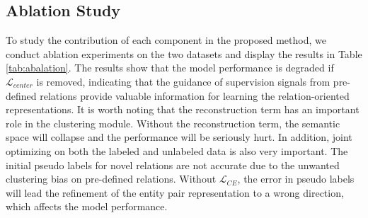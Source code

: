 \documentclass[11pt]{article}
\begin{document}
    \subsection{Ablation Study}
        \label{sec:ablation}
        \begin{table}
            \centering
            \caption{Abalation study of our method. This table only lists the results of metric $B^3$. For results of other metrics, please refer to the Table \ref{tab:det_aba} in Appendix \ref{app:other}.}
            \label{tab:abalation}
        \end{table}              
        To study the contribution of each component in the proposed method, we conduct ablation experiments on the two datasets and display the results in Table \ref{tab:abalation}. The results show that the model performance is degraded if $\mathcal{L}_{center}$ is removed, indicating that the guidance of supervision signals from pre-defined relations provide valuable information for learning the relation-oriented representations. It is worth noting that the reconstruction term has an important role in the clustering module. Without the reconstruction term, the semantic space will collapse and the performance will be seriously hurt. In addition, joint optimizing on both the labeled and unlabeled data is also very important. The initial pseudo labels for novel relations are not accurate due to the unwanted clustering bias on pre-defined relations. Without $\mathcal{L}_{CE}$, the error in pseudo labels will lead the refinement of the entity pair representation to a wrong direction, which affects the model performance.
    
\end{document}
